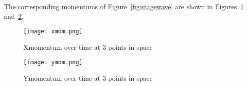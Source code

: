 The corresponding momentums of Figure~\ref{fig:stagewave} are shown in Figures~\ref{fig:xmom} and~\ref{fig:ymom}.
\begin{figure}
\begin{center}
\texttt{[image: xmom.png]}
\caption{Xmomentum over time at 3 points in space}
\label{fig:xmom}
\end{center}
\end{figure}
\begin{figure}
\begin{center}
\texttt{[image: ymom.png]}
\caption{Ymomentum over time at 3 points in space}
\label{fig:ymom}
\end{center}
\end{figure}



\endinput
